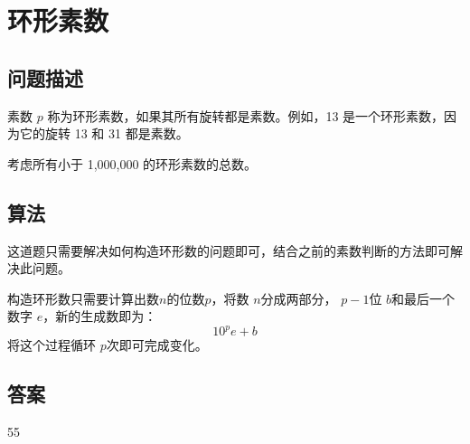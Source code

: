 \section{环形素数}\label{sec:problem35}
\subsection{问题描述}
\begin{tcolorbox}

素数 \( p \) 称为环形素数，如果其所有旋转都是素数。例如，13 是一个环形素数，因为它的旋转 13 和 31 都是素数。

考虑所有小于 1,000,000 的环形素数的总数。
\end{tcolorbox}

\subsection{算法}
这道题只需要解决如何构造环形数的问题即可，结合之前的素数判断的方法即可解决此问题。

构造环形数只需要计算出数$n$的位数$p$，将数 \( n \)分成两部分， \( p - 1 \)位 \( b \)和最后一个数字 \( e \)，新的生成数即为：
\begin{equation*}
 10^pe + b
\end{equation*}
将这个过程循环 \( p \)次即可完成变化。


\subsection{答案}
55
